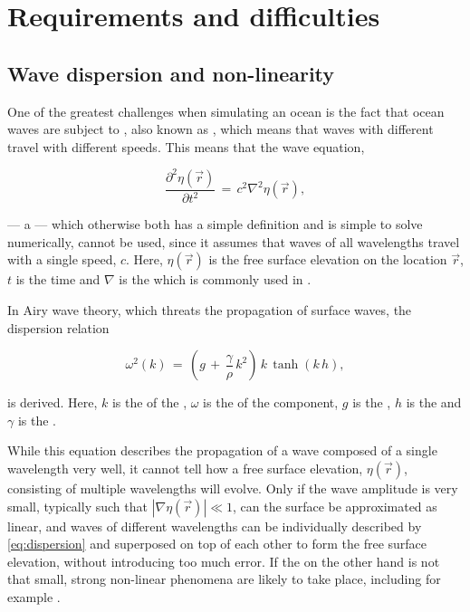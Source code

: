 \chapter{Requirements and difficulties}

\section{Wave dispersion and non-linearity}

One of the greatest challenges when simulating an ocean is the fact that ocean waves are subject to , also known as , which means that waves with different \wavelengths travel with different speeds. This means that the wave equation,

\begin{equation} \label{eq:wave_equation}
\frac{\partial^2 \eta(\vec{r})}{\partial t^2} \,=\, c^2\nabla^2\eta(\vec{r}),
\end{equation}

--- a \PDE\xspace --- which otherwise both has a simple definition and is simple to solve numerically, cannot be used, since it assumes that waves of all wavelengths travel with a single speed, $c$. Here, $\eta(\vec{r})$ is the free surface elevation on the location $\vec{r}$, $t$ is the time and $\nabla$ is the  which is commonly used in .

In Airy wave theory, which threats the propagation of surface waves, the dispersion relation

\begin{equation} \label{eq:dispersion}
\omega^2(k) \,=\, \left(g\,+\,\frac{\gamma}{\rho}\,k^2\right)\,k\,\tanh(k\,h),
\end{equation}

is derived. Here, $k$ is the  of the , $\omega$ is the  of the component, $g$ is the , $h$ is the  and $\gamma$ is the .

While this equation describes the propagation of a wave composed of a single wavelength very well, it cannot tell how a free surface elevation, $\eta(\vec{r})$, consisting of multiple wavelengths will evolve. Only if the wave amplitude is very small, typically such that $|\nabla\eta(\vec{r})| \ll 1$, can the surface be approximated as linear, and waves of different wavelengths can be individually described by \eqref{eq:dispersion} and superposed on top of each other to form the free surface elevation, without introducing too much error. If the  on the other hand is not that small, strong non-linear phenomena are likely to take place, including for example .

